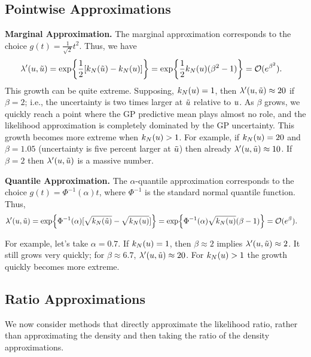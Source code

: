 \documentclass[12pt]{article}
\begin{document}
\subsection{Pointwise Approximations}

\noindent
\textbf{Marginal Approximation.} The marginal approximation corresponds to the choice $g(t) = \frac{1}{\sqrt{2}} t^2$. Thus, we have
\begin{align}
\lambda^\prime(u, \tilde{u}) 
&= \exp\mathopen{}\left\{\frac{1}{2}[k_{N}(\tilde{u}) - k_{N}(u)]\right\}\mathclose{} = \exp\mathopen{}\left\{\frac{1}{2}k_{N}(u)(\beta^2 - 1)\right\}\mathclose{} = \mathcal{O}(e^{\beta^2}).
\end{align}
This growth can be quite extreme. Supposing, $k_{N}(u) = 1$, then $\lambda^\prime(u, \tilde{u}) \approx 20$ if 
$\beta=2$; i.e., the uncertainty is two times larger at $\tilde{u}$ relative to $u$. As $\beta$ grows, we quickly reach a point where
the GP predictive mean plays almost no role, and the likelihood approximation is completely dominated by the GP uncertainty.
This growth becomes more extreme when $k_{N}(u) > 1$. For example, if $k_{N}(u) = 20$ and $\beta = 1.05$ (uncertainty
is five percent larger at $\tilde{u}$) then already $\lambda^\prime(u, \tilde{u}) \approx 10$. If $\beta = 2$ then 
$\lambda^\prime(u, \tilde{u})$ is a massive number.

\vspace*{10px}

\noindent
\textbf{Quantile Approximation.} The $\alpha$-quantile approximation corresponds to the choice $g(t) = \Phi^{-1}(\alpha) t$, where 
$\Phi^{-1}$ is the standard normal quantile function. Thus,
\begin{align}
\lambda^\prime(u, \tilde{u}) 
&= \exp\mathopen{}\left\{\Phi^{-1}(\alpha)[\sqrt{k_{N}(\tilde{u})} - \sqrt{k_{N}(u)}]\right\}\mathclose{} = \exp\mathopen{}\left\{\Phi^{-1}(\alpha)\sqrt{k_{N}(u)}(\beta - 1)\right\}\mathclose{} = \mathcal{O}(e^{\beta}).
\end{align}

For example, let's take $\alpha=0.7$. If $k_{N}(u) = 1$, then $\beta \approx 2$ implies $\lambda^\prime(u, \tilde{u})  \approx 2$. It 
still grows very quickly; for $\beta \approx 6.7$, $\lambda^\prime(u, \tilde{u})  \approx 20$. For $k_{N}(u) > 1$ the growth quickly 
becomes more extreme.

\subsection{Ratio Approximations}
We now consider methods that directly approximate the likelihood ratio, rather than approximating the density and then taking the ratio 
of the density approximations. 
\end{document}
